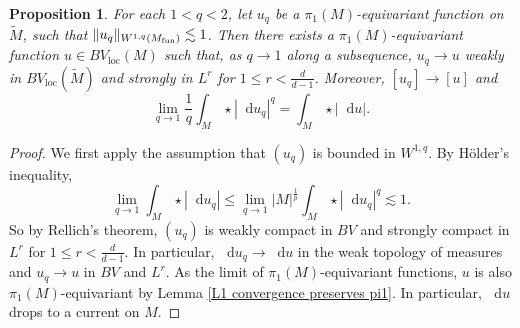 \documentclass[reqno,11pt]{amsart}
\newcommand*\dif{\mathop{}\!\mathrm{d}}
\newcommand{\loc}{\mathrm{loc}}
\newtheorem{proposition}[theorem]{Proposition}
\theoremstyle{definition}
\numberwithin{equation}{section}
\begin{document}
\begin{proposition}\label{qharmonics converge}
For each $1 < q < 2$, let $u_q$ be a $\pi_1(M)$-equivariant function on $\tilde M$, such that $\|u_q\|_{W^{1, q}(M_{\rm fun})} \lesssim 1$.
Then there exists a $\pi_1(M)$-equivariant function $u \in BV_\loc(M)$ such that, as $q \to 1$ along a subsequence, $u_q \to u$ weakly in $BV_\loc(\tilde M)$ and strongly in $L^r$ for $1 \leq r < \frac{d}{d - 1}$.
Moreover, $[u_q] \to [u]$ and
\begin{equation}\label{convergence of Lq norms to TV}
\lim_{q \to 1} \frac{1}{q} \int_M \star |\dif u_q|^q = \int_M \star |\dif u|.
\end{equation}
\end{proposition}
\begin{proof}
We first apply the assumption that $(u_q)$ is bounded in $W^{1, q}$.
By H\"older's inequality,
$$\lim_{q \to 1} \int_M \star |\dif u_q| \leq \lim_{q \to 1} |M|^{\frac{1}{p}} \int_M \star |\dif u_q|^q \lesssim 1.$$
So by Rellich's theorem, $(u_q)$ is weakly compact in $BV$ and strongly compact in $L^r$ for $1 \leq r < \frac{d}{d - 1}$.
In particular, $\dif u_q \to \dif u$ in the weak topology of measures and $u_q \to u$ in $BV$ and $L^r$.
As the limit of $\pi_1(M)$-equivariant functions, $u$ is also $\pi_1(M)$-equivariant by Lemma \ref{L1 convergence preserves pi1}.
In particular, $\dif u$ drops to a current on $M$.


\end{proof}
\end{document}
